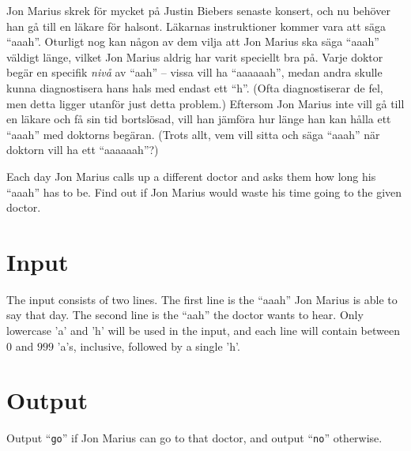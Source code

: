 



Jon Marius skrek för mycket på Justin Biebers senaste konsert, och nu behöver han 
gå till en läkare för halsont. Läkarnas instruktioner kommer vara att säga ``aaah''.
Oturligt nog kan någon av dem vilja att Jon Marius ska säga ``aaah'' väldigt länge, vilket
Jon Marius aldrig har varit speciellt bra på. Varje doktor begär en specifik \emph{nivå}
av ``aah'' -- vissa vill ha ``aaaaaah'', medan andra skulle kunna diagnostisera
hans hals med endast ett ``h''. (Ofta diagnostiserar de fel, men detta ligger
utanför just detta problem.) Eftersom Jon Marius inte vill gå till en läkare
och få sin tid bortslösad, vill han jämföra hur länge han kan hålla ett ``aaah''
med doktorns begäran. (Trots allt, vem vill sitta och säga ``aaah'' när doktorn
vill ha ett ``aaaaaah''?)

Each day Jon Marius calls up a different doctor and asks them how long his 
``aaah'' has to be. Find out if Jon Marius would waste his time going to the 
given doctor.

\section*{Input}
The input consists of two lines. The first line is the ``aaah'' Jon Marius is 
able to say that day. The second line is the ``aah'' the doctor wants to hear. 
Only lowercase 'a' and 'h' will be used in the input, and each line will contain 
between $0$ and $999$ 'a's, inclusive, followed by a single 'h'.

\section*{Output}
Output ``{\tt go}'' if Jon Marius can go to that doctor, and output ``{\tt no}'' otherwise. 
